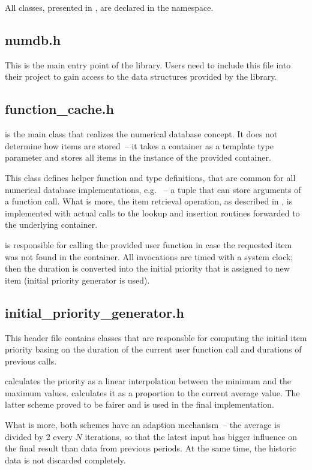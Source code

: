 All classes, presented in \numdbname, are declared in the  namespace.

\subsection{numdb.h}
This is the main entry point of the \numdbname library. Users need to include this file into their project to gain access to the data structures provided by the library.
\subsection{function\_cache.h}
 is the main class that realizes the numerical database concept. It does not determine how items are stored~-- it takes a container as a template type parameter and stores all items in the instance of the provided container.

This class defines helper function and type definitions, that are common for all numerical database implementations, e.g. ~-- a tuple that can store arguments of a function call. What is more, the item retrieval operation, as described in , is implemented with actual calls to the lookup and insertion routines forwarded to the underlying container.

 is responsible for calling the provided user function in case the requested item was not found in the container. All invocations are timed with a system clock; then the duration is converted into the initial priority that is assigned to new item (initial priority generator is used).

\subsection{initial\_priority\_generator.h}
This header file contains classes that are responsble for computing the initial item priority basing on the duration of the current user function call and durations of previous calls.

 calculates the priority as a linear interpolation between the minimum and the maximum values.  calculates it as a proportion to the current average value. The latter scheme proved to be fairer and is used in the final implementation.

What is more, both schemes have an adaption mechanism~-- the average is divided by 2 every $N$ iterations, so that the latest input has bigger influence on the final result than data from previous periods. At the same time, the historic data is not discarded completely.

